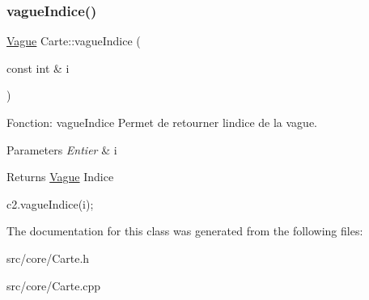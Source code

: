 \subsubsection{\texorpdfstring{vague\+Indice()}{vagueIndice()}}
{\footnotesize\ttfamily \hyperlink{classVague}{Vague} Carte\+::vague\+Indice (\begin{DoxyParamCaption}\item[{const int \&}]{i }\end{DoxyParamCaption})}



Fonction\+: vague\+Indice Permet de retourner l\textquotesingle{}indice de la vague. 


\begin{DoxyParams}{Parameters}
{\em Entier} & i \\
\hline
\end{DoxyParams}
\begin{DoxyReturn}{Returns}
\hyperlink{classVague}{Vague} Indice 
\begin{DoxyCode}
c2.vagueIndice(i);
\end{DoxyCode}
 
\end{DoxyReturn}


The documentation for this class was generated from the following files\+:\begin{DoxyCompactItemize}
\item 
src/core/Carte.\+h\item 
src/core/Carte.\+cpp\end{DoxyCompactItemize}
